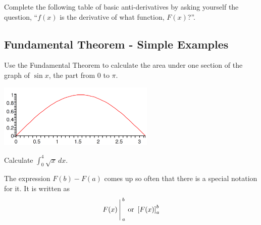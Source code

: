 \newpage

\problem
Complete the following table of basic anti-derivatives by
asking yourself the question, ``$f(x)$ is the derivative of what
function, $F(x)$?''.

\begin{center}
\end{center}

\newpage
{}
\subsection*{Fundamental Theorem - Simple Examples}

\problem Use the Fundamental Theorem to calculate the area under one
section of the graph of $\sin x$, the part from 0 to $\pi$.
\begin{center}
\includegraphics[width=7.5cm]{graphics/notes_04_sin}
\end{center}

\newpage
\problem
Calculate $\displaystyle \int_0^4 \sqrt{x}\,dx$.

\newpage
{}\medskip

\noindent The expression $F(b)-F(a)$ comes up so often that there is a special
notation for it.  It is written as
$$F(x)\Bigg\arrowvert_a^b \text{ or } \left[ F(x) \right]_a^b$$ 


